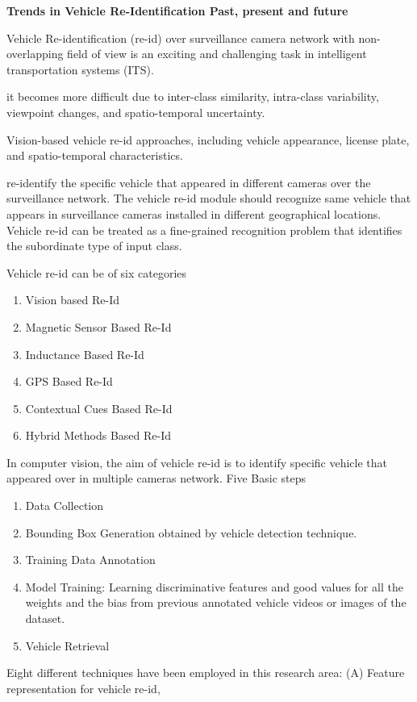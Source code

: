 \textbf{Trends in Vehicle Re-Identification Past, present and future \cite{deng2021trends}}

Vehicle Re-identification (re-id) over surveillance camera network with non-overlapping
field of view is an exciting and challenging task in intelligent transportation systems (ITS). 

it becomes
more difficult due to inter-class similarity, intra-class variability, viewpoint changes, and spatio-temporal uncertainty.

Vision-based vehicle
re-id approaches, including vehicle appearance, license plate, and spatio-temporal characteristics. 


re-identify the specific
vehicle that appeared in different cameras over the surveillance network. The vehicle re-id
module should recognize same vehicle that appears in surveillance cameras installed
in different geographical locations. Vehicle re-id can be treated as a fine-grained
recognition problem that identifies the subordinate type of input class.

Vehicle re-id can be of six categories
\begin{enumerate}
	\item Vision based Re-Id
	\item Magnetic Sensor Based Re-Id
	\item Inductance Based Re-Id
	\item GPS Based Re-Id
	\item Contextual Cues Based Re-Id
	\item Hybrid Methods Based Re-Id
\end{enumerate}


In computer vision, the aim of vehicle re-id is to identify specific vehicle that appeared
over in multiple cameras network. 
Five Basic steps
\begin{enumerate}
\item Data Collection
\item Bounding Box Generation obtained by vehicle detection technique.
\item Training Data Annotation
\item Model Training:  Learning discriminative
features and good values for all the weights and the bias from previous annotated vehicle videos or images of the dataset.
\item Vehicle Retrieval
\end{enumerate}

Eight different techniques have been employed in this research
area: 
(A) Feature representation for vehicle re-id, 

